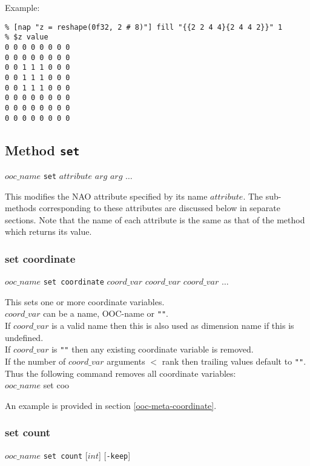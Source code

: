 Example:
  \begin{verbatim}
% [nap "z = reshape(0f32, 2 # 8)"] fill "{{2 2 4 4}{2 4 4 2}}" 1
% $z value
0 0 0 0 0 0 0 0
0 0 0 0 0 0 0 0
0 0 1 1 1 0 0 0
0 0 1 1 1 0 0 0
0 0 1 1 1 0 0 0
0 0 0 0 0 0 0 0
0 0 0 0 0 0 0 0
0 0 0 0 0 0 0 0
\end{verbatim}

\subsection{Method \texttt{set}}
    \label{ooc-modify-set}

  $ooc\_name$ 
  \texttt{set} 
  $attribute$ $arg$ $arg$ $\ldots$

This modifies the NAO attribute specified by 
  its name $attribute$. The sub-methods corresponding to these
  attributes are discussed below in separate sections. Note that the
  name of each attribute is the same as that of the method which
  returns its value.

\subsubsection{set coordinate}
    \label{ooc-modify-set-coordinate}

$ooc\_name$ \texttt{set coordinate} $coord\_var$ $coord\_var$ $coord\_var$ $\ldots$

This sets one or more coordinate variables.
  \\
  $coord\_var$ can be a name, OOC-name or 
  \texttt{""}.
  \\If 
  $coord\_var$ is a valid name then this is also used as
  dimension name if this is undefined.
  \\If 
  $coord\_var$ is 
  \texttt{""} then any existing coordinate variable is
  removed.
  \\If the number of 
  $coord\_var$ arguments $<$ rank then trailing values default
  to 
  \texttt{""}. Thus the following command removes all
  coordinate variables:
\\
$ooc\_name$ set coo

An example is provided in section \ref{ooc-meta-coordinate}.

\subsubsection{set count}
    \label{ooc-modify-set-count}

  $ooc\_name$ \texttt{set count} [$int$] [\texttt{-keep}]

